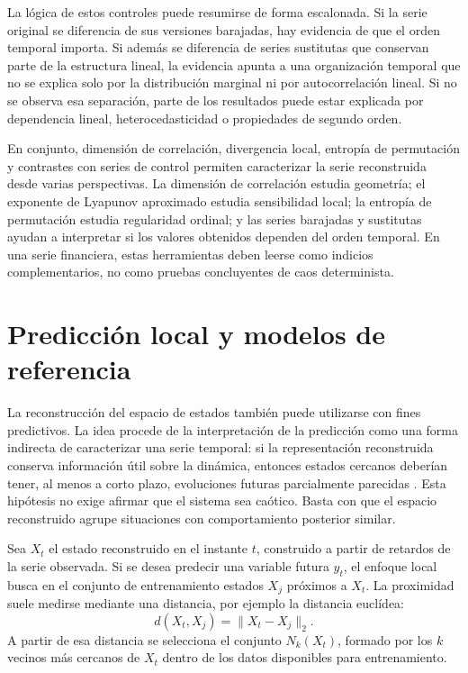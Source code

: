 La lógica de estos controles puede resumirse de forma escalonada. Si la serie original se diferencia de sus versiones barajadas, hay evidencia de que el orden temporal importa. Si además se diferencia de series sustitutas que conservan parte de la estructura lineal, la evidencia apunta a una organización temporal que no se explica solo por la distribución marginal ni por autocorrelación lineal. Si no se observa esa separación, parte de los resultados puede estar explicada por dependencia lineal, heterocedasticidad o propiedades de segundo orden.

En conjunto, dimensión de correlación, divergencia local, entropía de permutación y contrastes con series de control permiten caracterizar la serie reconstruida desde varias perspectivas. La dimensión de correlación estudia geometría; el exponente de Lyapunov aproximado estudia sensibilidad local; la entropía de permutación estudia regularidad ordinal; y las series barajadas y sustitutas ayudan a interpretar si los valores obtenidos dependen del orden temporal. En una serie financiera, estas herramientas deben leerse como indicios complementarios, no como pruebas concluyentes de caos determinista.

\section{Predicción local y modelos de referencia}\label{sec:prediccion-modelos-referencia}

La reconstrucción del espacio de estados también puede utilizarse con fines predictivos. La idea procede de la interpretación de la predicción como una forma indirecta de caracterizar una serie temporal: si la representación reconstruida conserva información útil sobre la dinámica, entonces estados cercanos deberían tener, al menos a corto plazo, evoluciones futuras parcialmente parecidas \cite{olmedo2001,kantz2003,abarbanel1996,farmer1987}. Esta hipótesis no exige afirmar que el sistema sea caótico. Basta con que el espacio reconstruido agrupe situaciones con comportamiento posterior similar.

Sea \(X_t\) el estado reconstruido en el instante \(t\), construido a partir de retardos de la serie observada. Si se desea predecir una variable futura \(y_t\), el enfoque local busca en el conjunto de entrenamiento estados \(X_j\) próximos a \(X_t\). La proximidad suele medirse mediante una distancia, por ejemplo la distancia euclídea:
\begin{equation}
    d(X_t,X_j)=\|X_t-X_j\|_2.
\end{equation}
A partir de esa distancia se selecciona el conjunto \(N_k(X_t)\), formado por los \(k\) vecinos más cercanos de \(X_t\) dentro de los datos disponibles para entrenamiento.

